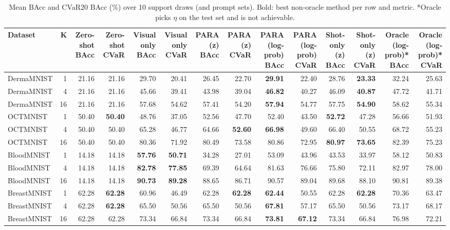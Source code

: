 \begin{table}[t]
\centering
\small
\caption{Mean BAcc and CVaR20 BAcc (\%) over 10 support draws (and prompt sets). Bold: best non-oracle method per row and metric. *Oracle picks $\eta$ on the test set and is not achievable.}
\label{tab:T2_main_results}
\begin{tabular}{lrrrrrrrrrrrrr}
\toprule
Dataset & K & Zero-shot BAcc & Zero-shot CVaR & Visual only BAcc & Visual only CVaR & PARA (z) BAcc & PARA (z) CVaR & PARA (log-prob) BAcc & PARA (log-prob) CVaR & Shot-only (z) BAcc & Shot-only (z) CVaR & Oracle (log-prob)* BAcc & Oracle (log-prob)* CVaR \\
\midrule
DermaMNIST & 1 & 21.16 & 21.16 & 29.70 & 20.41 & 26.45 & 22.70 & \textbf{29.91} & 22.40 & 28.76 & \textbf{23.33} & 32.24 & 25.63 \\
DermaMNIST & 4 & 21.16 & 21.16 & 45.66 & 39.41 & 43.98 & 39.04 & \textbf{46.82} & 40.27 & 46.09 & \textbf{40.87} & 47.72 & 41.71 \\
DermaMNIST & 16 & 21.16 & 21.16 & 57.68 & 54.62 & 57.41 & 54.20 & \textbf{57.94} & 54.77 & 57.75 & \textbf{54.90} & 58.62 & 55.34 \\
OCTMNIST & 1 & 50.40 & \textbf{50.40} & 48.76 & 37.05 & 52.56 & 47.70 & 52.40 & 43.50 & \textbf{52.72} & 47.28 & 56.66 & 51.93 \\
OCTMNIST & 4 & 50.40 & 50.40 & 65.28 & 46.77 & 64.66 & \textbf{52.60} & \textbf{66.98} & 49.60 & 66.40 & 50.55 & 68.72 & 55.23 \\
OCTMNIST & 16 & 50.40 & 50.40 & 80.36 & 71.92 & 80.49 & 73.58 & 80.86 & 72.95 & \textbf{80.97} & \textbf{73.65} & 82.39 & 75.23 \\
BloodMNIST & 1 & 14.18 & 14.18 & \textbf{57.76} & \textbf{50.71} & 34.28 & 27.01 & 53.09 & 43.96 & 43.53 & 33.97 & 58.12 & 50.83 \\
BloodMNIST & 4 & 14.18 & 14.18 & \textbf{82.78} & \textbf{77.85} & 69.39 & 64.64 & 81.63 & 76.66 & 75.80 & 72.11 & 82.97 & 78.00 \\
BloodMNIST & 16 & 14.18 & 14.18 & \textbf{90.73} & \textbf{89.28} & 88.65 & 86.71 & 90.57 & 89.04 & 89.68 & 88.10 & 90.81 & 89.38 \\
BreastMNIST & 1 & 62.28 & \textbf{62.28} & 60.96 & 46.49 & 62.28 & \textbf{62.28} & \textbf{62.44} & 50.55 & 62.28 & \textbf{62.28} & 70.36 & 63.47 \\
BreastMNIST & 4 & 62.28 & \textbf{62.28} & 65.50 & 50.56 & 65.50 & 50.56 & \textbf{67.81} & 57.17 & 65.50 & 50.56 & 73.17 & 68.17 \\
BreastMNIST & 16 & 62.28 & 62.28 & 73.34 & 66.84 & 73.34 & 66.84 & \textbf{73.81} & \textbf{67.12} & 73.34 & 66.84 & 76.98 & 72.21 \\

\end{tabular}
\end{table}
